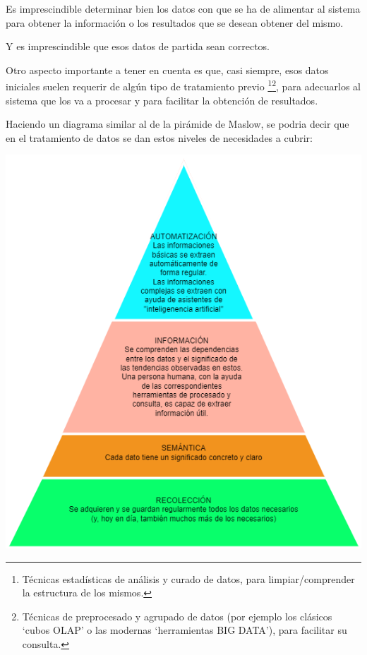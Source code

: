 \documentclass[spanish,12pt,a4paper,final,oneside]{book}
\begin{document}
Es imprescindible determinar bien los datos con que se ha de alimentar al sistema para obtener la información o los resultados que se desean obtener del mismo.

Y es imprescindible que esos datos de partida sean correctos.

\vspace{1cm}

Otro aspecto importante a tener en cuenta es que, casi siempre, esos datos iniciales suelen requerir de algún tipo de tratamiento previo \footnote{Técnicas estadísticas de análisis y curado de datos, para limpiar/comprender la estructura de los mismos.}\footnote{Técnicas de preprocesado y agrupado de datos (por ejemplo los clásicos `cubos OLAP' o las modernas `herramientas BIG DATA'), para facilitar su consulta.}, para adecuarlos al sistema que los va a procesar y para facilitar la obtención de resultados.

\vspace{1cm}

Haciendo un diagrama similar al de la pirámide de Maslow, se podria decir que en el tratamiento de datos se dan estos niveles de necesidades a cubrir:

\includegraphics[width=\textwidth]{PiramideDeTratamientoDeDatos}
\end{document}
